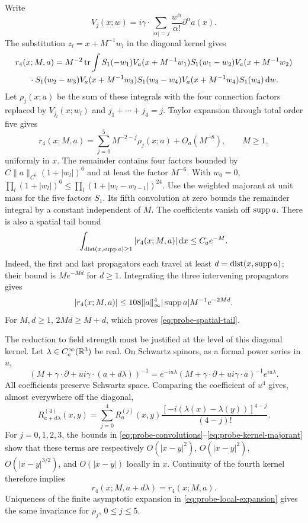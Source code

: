 Write
\[
 V_j(x;w)=i\gamma\cdot\sum_{|\alpha|=j}
                  \frac{w^\alpha}{\alpha!}\partial^\alpha a(x).
\]
The substitution $z_l=x+M^{-1}w_l$ in the diagonal kernel gives
\begin{multline}\label{eq:probe-scaled-kernel}
 r_4(x;M,a)=M^{-2}\operatorname{tr}\int S_1(-w_1)V_a(x+M^{-1}w_1)
 S_1(w_1-w_2)V_a(x+M^{-1}w_2)\\
 {}\cdot S_1(w_2-w_3)V_a(x+M^{-1}w_3)
 S_1(w_3-w_4)V_a(x+M^{-1}w_4)S_1(w_4)\,\mathrm d w.
\end{multline}
Let $\rho_j(x;a)$ be the sum of these integrals with the four
connection factors replaced by $V_{j_l}(x;w_l)$ and
$j_1+\cdots+j_4=j$. Taylor expansion through total order five gives
\begin{equation}\label{eq:probe-local-expansion}
 r_4(x;M,a)=\sum_{j=0}^5M^{-2-j}\rho_j(x;a)+O_a(M^{-8}),
 \qquad M\ge1,
\end{equation}
uniformly in $x$. The remainder contains four factors bounded by
$C\|a\|_{C^6}(1+|w_l|)^6$ and at least the factor $M^{-6}$.
With $w_0=0$,
$\prod_l(1+|w_l|)^6\le\prod_l(1+|w_l-w_{l-1}|)^{24}$.
Use the weighted majorant at unit mass for the five factors $S_1$.
Its fifth convolution at zero bounds the remainder integral by a
constant independent of $M$.
The coefficients vanish off $\operatorname{supp} a$. There is also a spatial tail
bound
\begin{equation}\label{eq:probe-spatial-tail}
 \int_{\operatorname{dist}(x,\operatorname{supp} a)\ge1}|r_4(x;M,a)|\,\mathrm d x
 \le C_ae^{-M}.
\end{equation}
Indeed, the first and last propagators each travel at least
$d=\operatorname{dist}(x,\operatorname{supp} a)$; their bound is $Me^{-Md}$ for
$d\ge1$. Integrating the three intervening propagators gives
\[
 |r_4(x;M,a)|\le108\|a\|_\infty^4|\operatorname{supp} a|M^{-1}e^{-2Md}.
\]
For $M,d\ge1$, $2Md\ge M+d$, which proves
\eqref{eq:probe-spatial-tail}.

The reduction to field strength must be justified at the level of this
diagonal kernel. Let $\lambda\in C_c^\infty(\mathbb R^3)$ be real. On Schwartz
spinors, as a formal power series in $u$,
\[
 (M+\gamma\cdot\partial+ui\gamma\cdot(a+d\lambda))^{-1}
 =e^{-iu\lambda}(M+\gamma\cdot\partial+ui\gamma\cdot a)^{-1}
                       e^{iu\lambda}.
\]
All coefficients preserve Schwartz space. Comparing the coefficient
of $u^4$ gives, almost everywhere off the diagonal,
\begin{equation}\label{eq:probe-gauge-kernel}
 R_{a+d\lambda}^{(4)}(x,y)=\sum_{j=0}^4R_a^{(j)}(x,y)
       \frac{[-i(\lambda(x)-\lambda(y))]^{4-j}}{(4-j)!}.
\end{equation}
For $j=0,1,2,3$, the bounds in
\eqref{eq:probe-convolutions}--\eqref{eq:probe-kernel-majorant} show
that these terms are respectively $O(|x-y|^2)$,
$O(|x-y|^2)$, $O(|x-y|^{3/2})$, and $O(|x-y|)$ locally in $x$.
Continuity of the fourth kernel therefore implies
\[
 r_4(x;M,a+d\lambda)=r_4(x;M,a).
\]
Uniqueness of the finite asymptotic expansion in
\eqref{eq:probe-local-expansion} gives the same invariance for
$\rho_j$, $0\le j\le5$.

